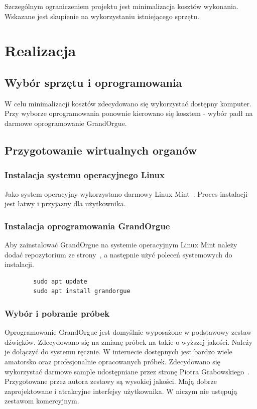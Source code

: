 \documentclass[11pt]{report}
\begin{document}
    Szczególnym ograniczeniem projektu jest minimalizacja kosztów wykonania.
    Wskazane jest skupienie na wykorzystaniu istniejącego sprzętu.


    \chapter{Realizacja}


    \section{Wybór sprzętu i oprogramowania}
    W celu minimalizacji kosztów zdecydowano się wykorzystać dostępny komputer.
    Przy wyborze oprogramowania ponownie kierowano się kosztem - wybór padł na darmowe oprogramowanie GrandOrgue.


    \section{Przygotowanie wirtualnych organów}

    \subsection{Instalacja systemu operacyjnego Linux}
    Jako system operacyjny wykorzystano darmowy Linux Mint~\cite{mint}.
    Proces instalacji jest łatwy i przyjazny dla użytkownika.

    \subsection{Instalacja oprogramowania GrandOrgue}
    Aby zainstalować GrandOrgue na systemie operacyjnym Linux Mint należy dodać repozytorium ze strony~\cite{grandorgueRepo},
    a następnie użyć poleceń systemowych do instalacji.
    \begin{verbatim}
        sudo apt update
        sudo apt install grandorgue
    \end{verbatim}

    \subsection{Wybór i pobranie próbek}
    Oprogramowanie GrandOrgue jest domyślnie wyposażone w podstawowy zestaw dźwięków.
    Zdecydowano się na zmianę próbek na takie o wyższej jakości.
    Należy je dołączyć do systemu ręcznie.
    W internecie dostępnych jest bardzo wiele amatorsko oraz profesjonalnie opracowanych próbek.
    Zdecydowano się wykorzystać darmowe sample udostępniane przez stronę Piotra Grabowskiego~\cite{grabowski}.
    Przygotowane przez autora zestawy są wysokiej jakości.
    Mają dobrze zaprojektowane i atrakcyjne interfejsy użytkownika.
    W niczym nie ustępują zestawom komercyjnym.
\end{document}
